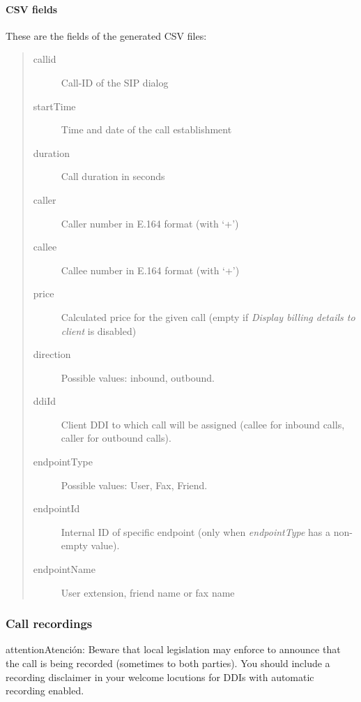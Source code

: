 \documentclass[letterpaper,10pt,spanish]{sphinxmanual}
\begin{document}
\paragraph{CSV fields}
\label{administration_portal/client/vpbx/calls/call_csv_schedulers:csv-fields}
These are the fields of the generated CSV files:
\begin{quote}
\begin{description}
\item[{callid}] \leavevmode
Call-ID of the SIP dialog

\item[{startTime}] \leavevmode
Time and date of the call establishment

\item[{duration}] \leavevmode
Call duration in seconds

\item[{caller}] \leavevmode
Caller number in E.164 format (with `+')

\item[{callee}] \leavevmode
Callee number in E.164 format (with `+')

\item[{price}] \leavevmode
Calculated price for the given call (empty if \emph{Display billing details to client} is disabled)

\item[{direction}] \leavevmode
Possible values: inbound, outbound.

\item[{ddiId}] \leavevmode
Client DDI to which call will be assigned (callee for inbound calls, caller for outbound calls).

\item[{endpointType}] \leavevmode
Possible values: User, Fax, Friend.

\item[{endpointId}] \leavevmode
Internal ID of specific endpoint (only when \emph{endpointType} has a non-empty value).

\item[{endpointName}] \leavevmode
User extension, friend name or fax name

\end{description}
\end{quote}


\subsubsection{Call recordings}
\label{administration_portal/client/vpbx/calls/call_recordings::doc}\label{administration_portal/client/vpbx/calls/call_recordings:call-recordings}\label{administration_portal/client/vpbx/calls/call_recordings:id1}
\begin{notice}{attention}{Atención:}
Beware that local legislation may enforce to announce that the
call is being recorded (sometimes to both parties). You should include
a recording disclaimer in your welcome locutions for DDIs with automatic
recording enabled.
\end{notice}
\end{document}
